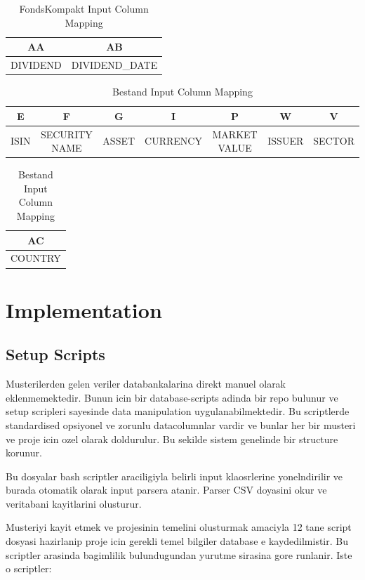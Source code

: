 \begin{table}[H]
\centering
\begin{tabular}{|c|c|}
\hline
AA & AB \\
\hline
DIVIDEND & DIVIDEND\_DATE \\
\hline
\end{tabular}
\caption{FondsKompakt Input Column Mapping}
\label{tab:fondskompakt-columns}
\end{table}


\begin{table}[H]
\centering
\begin{tabular}{|c|c|c|c|c|c|c|}
\hline
E & F & G & I & P & W & V \\
\hline
ISIN & SECURITY NAME & ASSET & CURRENCY & MARKET VALUE & ISSUER & SECTOR  \\
\hline
\end{tabular}
\caption{Bestand Input Column Mapping}
\label{tab:bestand-columns}
\end{table}

\begin{table}[H]
\centering
\begin{tabular}{|c|}
\hline
AC \\
\hline
COUNTRY \\
\hline
\end{tabular}
\caption{Bestand Input Column Mapping}
\label{tab:bestand-columns}
\end{table}



\section{Implementation}
\subsection{Setup Scripts}
Musterilerden gelen veriler databankalarina direkt manuel olarak eklenmemektedir. Bunun icin bir database-scripts adinda bir repo bulunur ve setup scripleri sayesinde data manipulation uygulanabilmektedir.
Bu scriptlerde standardised opsiyonel ve zorunlu datacolumnlar vardir ve bunlar her bir musteri ve proje icin ozel olarak doldurulur. Bu sekilde sistem genelinde bir structure korunur.

Bu dosyalar bash scriptler araciligiyla belirli input klaosrlerine yonelndirilir ve burada otomatik olarak input parsera atanir. Parser CSV doyasini okur ve veritabani kayitlarini olusturur.

Musteriyi kayit etmek ve projesinin temelini olusturmak amaciyla 12 tane script dosyasi hazirlanip proje icin gerekli temel bilgiler database e kaydedilmistir. 
Bu scriptler arasinda bagimlilik bulundugundan yurutme sirasina gore runlanir. Iste o scriptler:

